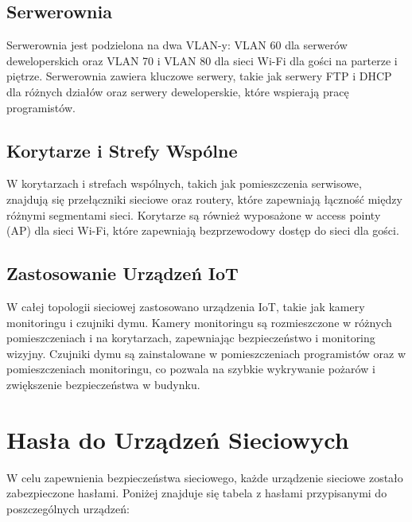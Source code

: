 \subsection{Serwerownia}
Serwerownia jest podzielona na dwa VLAN-y: VLAN 60 dla serwerów deweloperskich oraz VLAN 70 i VLAN 80 dla sieci Wi-Fi dla gości na parterze i piętrze. Serwerownia zawiera kluczowe serwery, takie jak serwery FTP i DHCP dla różnych działów oraz serwery deweloperskie, które wspierają pracę programistów.

\subsection{Korytarze i Strefy Wspólne}
W korytarzach i strefach wspólnych, takich jak pomieszczenia serwisowe, znajdują się przełączniki sieciowe oraz routery, które zapewniają łączność między różnymi segmentami sieci. Korytarze są również wyposażone w access pointy (AP) dla sieci Wi-Fi, które zapewniają bezprzewodowy dostęp do sieci dla gości.

\subsection{Zastosowanie Urządzeń IoT}
W całej topologii sieciowej zastosowano urządzenia IoT, takie jak kamery monitoringu i czujniki dymu. Kamery monitoringu są rozmieszczone w różnych pomieszczeniach i na korytarzach, zapewniając bezpieczeństwo i monitoring wizyjny. Czujniki dymu są zainstalowane w pomieszczeniach programistów oraz w pomieszczeniach monitoringu, co pozwala na szybkie wykrywanie pożarów i zwiększenie bezpieczeństwa w budynku.

\section{Hasła do Urządzeń Sieciowych}
W celu zapewnienia bezpieczeństwa sieciowego, każde urządzenie sieciowe zostało zabezpieczone hasłami. Poniżej znajduje się tabela z hasłami przypisanymi do poszczególnych urządzeń:

